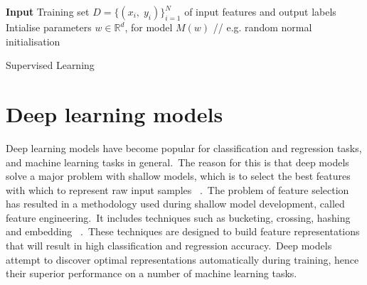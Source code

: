 \bigskip

\begin{algorithm}[H]
	\SetAlgoLined
	\textbf{Input} 
	Training set \begin{math} D = \{(x_i, \; y_i)\}_{i=1}^N \end{math} of input features and output labels\;
	Intialise parameters $w \in \mathbb{R}^d$, for model \begin{math} M(w) \end{math} // e.g. random normal initialisation \\
	\caption{Supervised Learning}
\end{algorithm}



\section{Deep learning models}

Deep learning models have become popular for classification and regression tasks, and machine learning tasks in general.\ The reason for this is that deep models solve a major problem with shallow models, which is to select the best features with which to represent raw input samples \unskip ~\citep{Goodfellow-et-al-2016}.\ The problem of feature selection has resulted in a methodology used during shallow model development, called feature engineering.\ It includes techniques such as bucketing, crossing, hashing and embedding \unskip ~\citep{murphy2012machine, Goodfellow-et-al-2016}.\ These techniques are designed to build feature representations that will result in high classification and regression accuracy.\ Deep models attempt to discover optimal representations automatically during training, hence their superior performance on a number of machine learning tasks. \par

